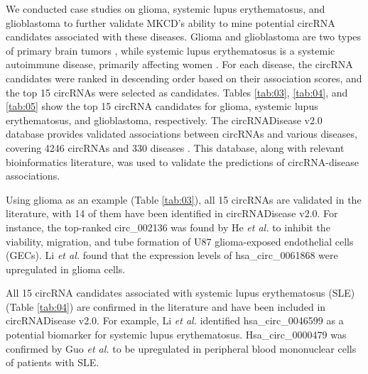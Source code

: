\documentclass[journal,twoside,web]{ieeecolor}
\begin{document}
We conducted case studies on glioma, systemic lupus erythematosus, and glioblastoma to further validate MKCD’s ability to mine potential circRNA candidates associated with these diseases. Glioma and glioblastoma are two types of primary brain tumors \cite{weller2015glioma, wirsching2017glioblastoma}, while systemic lupus erythematosus is a systemic autoimmune disease, primarily affecting women \cite{kaul2016systemic}. For each disease, the circRNA candidates were ranked in descending order based on their association scores, and the top 15 circRNAs were selected as candidates. Tables \ref{tab:03}, \ref{tab:04}, and \ref{tab:05} show the top 15 circRNA candidates for glioma, systemic lupus erythematosus, and glioblastoma, respectively. The circRNADisease v2.0 database provides validated associations between circRNAs and various diseases, covering 4246 circRNAs and 330 diseases \cite{fan2022circr2disease}. This database, along with relevant bioinformatics literature, was used to validate the predictions of circRNA-disease associations.

Using glioma as an example (Table \ref{tab:03}), all 15 circRNAs are validated in the literature, with 14 of them have been identified in circRNADisease v2.0. For instance, the top-ranked circ\_002136 was found by He {\it et al.} \cite{he2019fus} to inhibit the viability, migration, and tube formation of U87 glioma-exposed endothelial cells (GECs). Li {\it et al.} \cite{li2019circ} found that the expression levels of hsa\_circ\_0061868 were upregulated in glioma cells.

All 15 circRNA candidates associated with systemic lupus erythematosus (SLE) (Table \ref{tab:04}) are confirmed in the literature and have been included in circRNADisease v2.0. For example, Li {\it et al.} \cite{li2018comprehensive} identified hsa\_circ\_0046599 as a potential biomarker for systemic lupus erythematosus. Hsa\_circ\_0000479 was confirmed by Guo {\it et al.} \cite{guo2019hsa_circ_0000479} to be upregulated in peripheral blood mononuclear cells of patients with SLE.
\end{document}
